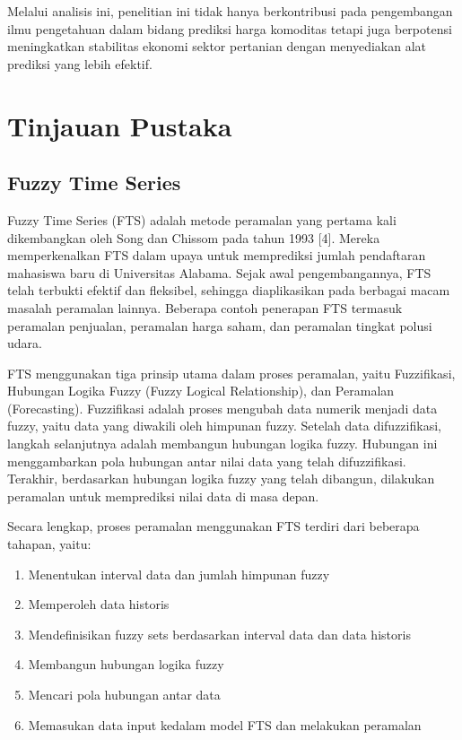 \documentclass[conference]{IEEEtran}
\begin{document}
Melalui analisis ini, penelitian ini tidak hanya berkontribusi pada pengembangan ilmu pengetahuan dalam bidang prediksi harga komoditas tetapi juga berpotensi meningkatkan stabilitas ekonomi sektor pertanian dengan menyediakan alat prediksi yang lebih efektif.


\section{Tinjauan Pustaka}

\subsection{Fuzzy Time Series}
Fuzzy Time Series (FTS) adalah metode peramalan yang pertama kali dikembangkan oleh Song dan Chissom pada tahun 1993 [4]. Mereka memperkenalkan FTS dalam upaya untuk memprediksi jumlah pendaftaran mahasiswa baru di Universitas Alabama. Sejak awal pengembangannya, FTS telah terbukti efektif dan fleksibel, sehingga diaplikasikan pada berbagai macam masalah peramalan lainnya. Beberapa contoh penerapan FTS termasuk peramalan penjualan, peramalan harga saham, dan peramalan tingkat polusi udara.

FTS menggunakan tiga prinsip utama dalam proses peramalan, yaitu Fuzzifikasi, Hubungan Logika Fuzzy (Fuzzy Logical Relationship), dan Peramalan (Forecasting). Fuzzifikasi adalah proses mengubah data numerik menjadi data fuzzy, yaitu data yang diwakili oleh himpunan fuzzy. Setelah data difuzzifikasi, langkah selanjutnya adalah membangun hubungan logika fuzzy. Hubungan ini menggambarkan pola hubungan antar nilai data yang telah difuzzifikasi. Terakhir, berdasarkan hubungan logika fuzzy yang telah dibangun, dilakukan peramalan untuk memprediksi nilai data di masa depan.

Secara lengkap, proses peramalan menggunakan FTS terdiri dari beberapa tahapan, yaitu:
\begin{enumerate}
    \item Menentukan interval data dan jumlah himpunan fuzzy
    \item Memperoleh data historis
    \item Mendefinisikan fuzzy sets berdasarkan interval data dan data historis
    \item Membangun hubungan logika fuzzy
    \item Mencari pola hubungan antar data
    \item Memasukan data input kedalam model FTS dan melakukan peramalan
\end{enumerate}
\end{document}
